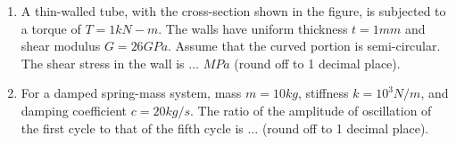 \documentclass[journal]{IEEEtran}
\begin{document}
\begin{enumerate}[start=53]
\begin{figure}[H]
\label{fig:my_label}
\end{figure}

    \item A thin-walled tube, with the cross-section shown in the figure, is subjected to a torque of $T=1 kN-m$. The walls have uniform thickness $t = 1 mm$ and shear modulus $G = 26 GPa$. Assume that the curved portion is semi-circular. The shear stress in the wall is $\dots$ $MPa$ (round off to 1 decimal place).

    \begin{figure}[H]
\centering
{}%

\label{fig:my_label}
\end{figure}

    \item For a damped spring-mass system, mass $m = 10 kg$, stiffness $k = 10^3 N/m$, and damping coefficient $c = 20 kg/s$. The ratio of the amplitude of oscillation of the first cycle to that of the fifth cycle is $\dots$ (round off to 1 decimal place).


\end{enumerate}
\end{document}
